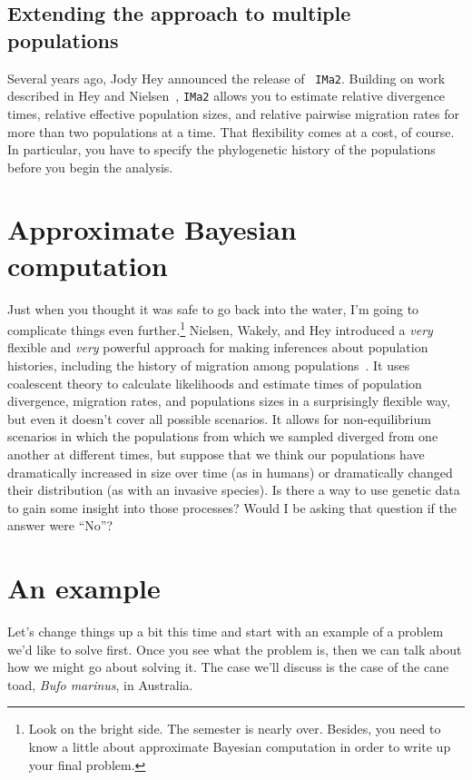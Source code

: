 \documentclass[12pt]{article}
\begin{document}
\subsection*{Extending the approach to multiple populations}

Several years ago, Jody Hey announced the release of {\tt
  IMa2}. Building on work described in Hey and
Nielsen~\cite{Hey-Nielsen-2004,Hey-Nielsen-2007}, {\tt IMa2} allows
you to estimate relative divergence times, relative effective
population sizes, and relative pairwise migration rates for more than
two populations at a time. That flexibility comes at a cost, of
course. In particular, you have to specify the phylogenetic history of
the populations before you begin the analysis.



\section*{Approximate Bayesian computation}

Just when you thought it was safe to go back into the water, I'm going
to complicate things even further.\footnote{Look on the bright
  side. The semester is nearly over. Besides, you need to know a
  little about approximate Bayesian computation in order to write up
  your final problem.} Nielsen, Wakely, and Hey introduced a {\it
  very\/} flexible and {\it very\/} powerful approach for making
inferences about population histories, including the history of
migration among
populations~\cite{Nielsen-Wakeley-2001,Hey-Nielsen-2004,Hey-Nielsen-2007}. It
uses coalescent theory to calculate likelihoods and estimate times of
population divergence, migration rates, and populations sizes in a
surprisingly flexible way, but even it doesn't cover all possible
scenarios. It allows for non-equilibrium scenarios in which the
populations from which we sampled diverged from one another at
different times, but suppose that we think our populations have
dramatically increased in size over time (as in humans) or
dramatically changed their distribution (as with an invasive
species). Is there a way to use genetic data to gain some insight into
those processes? Would I be asking that question if the answer were
``No''?

\section*{An example}

Let's change things up a bit this time and start with an example of a
problem we'd like to solve first. Once you see what the problem is,
then we can talk about how we might go about solving it. The case
we'll discuss is the case of the cane toad, {\it Bufo marinus}, in
Australia.
\end{document}
